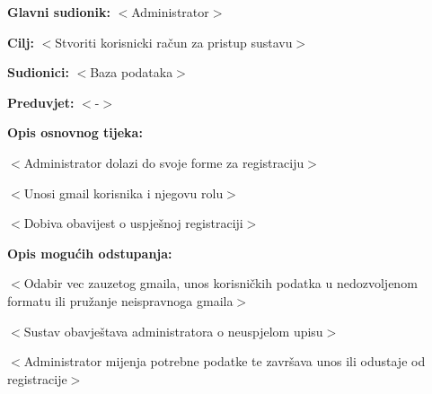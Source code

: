 					\noindent {}
					\begin{packed_item}

						\item \textbf{Glavni sudionik: }$<$Administrator$>$
						\item  \textbf{Cilj:} $<$Stvoriti korisnicki račun za pristup sustavu$>$
						\item  \textbf{Sudionici:} $<$Baza podataka$>$
						\item  \textbf{Preduvjet:} $<$-$>$
						\item  \textbf{Opis osnovnog tijeka:}

						\item[] \begin{packed_enum}

									\item $<$Administrator dolazi do svoje forme za registraciju$>$
									\item $<$Unosi gmail korisnika i njegovu rolu$>$
									\item $<$Dobiva obavijest o uspješnoj registraciji$>$
						\end{packed_enum}

						\item  \textbf{Opis mogućih odstupanja:}

						\item[] \begin{packed_item}

							\item[2.a] $<$Odabir vec zauzetog gmaila, unos korisničkih
							podatka u nedozvoljenom formatu ili pružanje neispravnoga gmaila$>$
							\item[] \begin{packed_enum}

								\item $<$Sustav obavještava administratora o neuspjelom upisu$>$
								\item $<$Administrator mijenja potrebne podatke te završava unos ili
								odustaje od registracije$>$

							\end{packed_enum}

						\end{packed_item}
					\end{packed_item}

